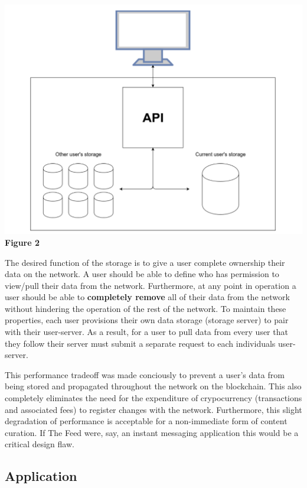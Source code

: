 \documentclass[pageno]{jpaper}
\begin{document}
\begin{multicols*}{2}
\begin{center}
	\includegraphics[scale=0.4]{pic3.jpg} \\
	\textbf{Figure 2}
\end{center}

The desired function of the storage is to give a user complete ownership their data on the network. A user should be able to define who has permission to view/pull their data from the network. Furthermore, at any point in operation a user should be able to \textbf{completely remove} all of their data from the network without hindering the operation of the rest of the network. To maintain these properties, each user provisions their own data storage (storage server) to pair with their user-server. As a result, for a user to pull data from every user that they follow their server must submit a separate request to each individuals user-server.\par
This performance tradeoff was made conciously to prevent a user's data from being stored and propagated throughout the network on the blockchain. This also completely eliminates the need for the expenditure of crypocurrency (transactions and associated fees) to register changes with the network. Furthermore, this slight degradation of performance is acceptable for a non-immediate form of content curation. If The Feed were, say, an instant messaging application this would be a critical design flaw.\newline

\subsection{Application}
\label{section:application}


\end{multicols*}
\end{document}
